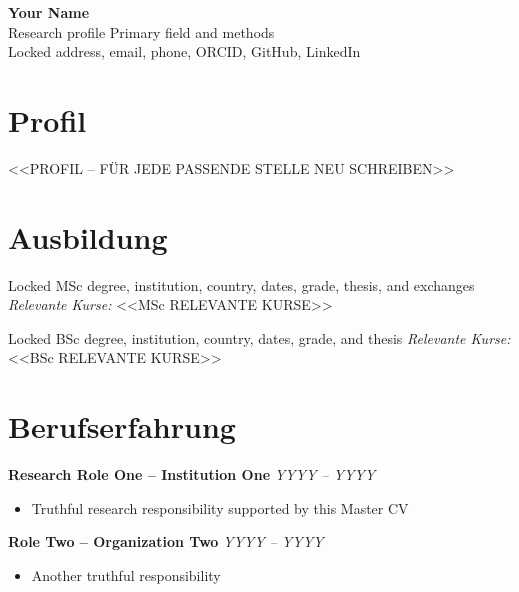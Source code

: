 \documentclass[a4paper,10pt]{article}
\begin{document}
{\Huge \textbf{Your Name}}\\
{\normalsize Research profile \textbar{} Primary field and methods}\\[0.5em]
Locked address, email, phone, ORCID, GitHub, LinkedIn


\section*{Profil}
<<PROFIL -- FÜR JEDE PASSENDE STELLE NEU SCHREIBEN>>

\section*{Ausbildung}
Locked MSc degree, institution, country, dates, grade, thesis, and exchanges
\textit{Relevante Kurse:} <<MSc RELEVANTE KURSE>>

Locked BSc degree, institution, country, dates, grade, and thesis
\textit{Relevante Kurse:} <<BSc RELEVANTE KURSE>>

\section*{Berufserfahrung}
\textbf{Research Role One -- Institution One} \hfill \textit{YYYY -- YYYY}\\
\begin{itemize}[leftmargin=1.5em, noitemsep]
  \item Truthful research responsibility supported by this Master CV
\end{itemize}
\vspace{0.4em}
\textbf{Role Two -- Organization Two} \hfill \textit{YYYY -- YYYY}\\
\begin{itemize}[leftmargin=1.5em, noitemsep]
  \item Another truthful responsibility
\end{itemize}
\end{document}
